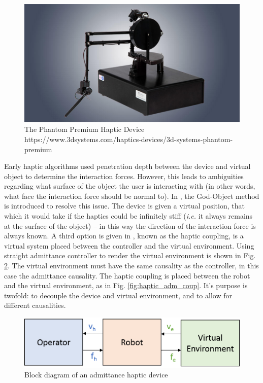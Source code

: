 \documentclass[12pt]{report}
\begin{document}
	
	\begin{figure}[t] 
		\centering
		\includegraphics[width=0.6\linewidth]{phantom}
		\caption{The Phantom Premium Haptic Device https://www.3dsystems.com/haptics-devices/3d-systems-phantom-premium}
		\label{fig:phantom}
	\end{figure}		
	
	
		
	
		Early haptic algorithms used penetration depth between the device and virtual object to determine the interaction forces. However, this leads to ambiguities regarding what surface of the object the user is interacting with (in other words, what face the interaction force should be normal to). In \cite{Zilles}, the God-Object method is introduced to resolve this issue. The device is given a virtual position, that which it would take if the haptics could be infinitely stiff (\textit{i.e.} it always remains at the surface of the object) -- in this way the direction of the interaction force is always known. A third option is given in \cite{Adams1999}, known as the haptic coupling, is a virtual system placed between the controller and the virtual environment. Using straight admittance controller to render the virtual environment is shown in Fig. \ref{fig:haptic_adm}. The virtual environment must have the same causality as the controller, in this case the admittance causality. The haptic coupling is placed between the robot and the virtual environment, as in Fig. \ref{fig:haptic_adm_coup}. It's purpose is twofold: to decouple the device and virtual environment, and to allow for different causalities.
	
	\begin{figure}[h] 
		\centering
		\includegraphics[width=0.75\linewidth]{haptics_admittance}
		\caption{Block diagram of an admittance haptic device}
		\label{fig:haptic_adm}
	\end{figure}	
	
\end{document}
